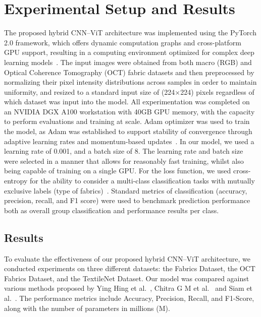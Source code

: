 \vspace{-1em}
\section{Experimental Setup and Results}

The proposed hybrid CNN–ViT architecture was implemented using the PyTorch 2.0 framework, which offers dynamic computation graphs and cross-platform GPU support, resulting in a computing environment optimized for complex deep learning models~\cite{paszke2019pytorch}. The input images were obtained from both macro (RGB) and Optical Coherence Tomography (OCT) fabric datasets and then preprocessed by normalizing their pixel intensity distributions across samples in order to maintain uniformity, and resized to a standard input size of (224×224) pixels regardless of which dataset was input into the model. All experimentation was completed on an NVIDIA DGX A100 workstation with 40GB GPU memory, with the capacity to perform evaluations and training at scale. Adam optimizer was used to train the model, as Adam was established to support stability of convergence through adaptive learning rates and momentum-based updates~\cite{kingma2014adam}. In our model, we used a learning rate of 0.001, and a batch size of 8. The learning rate and batch size were selected in a manner that allows for reasonably fast training, whilst also being capable of training on a single GPU. For the loss function, we used cross-entropy for the ability to consider a multi-class classification tasks with mutually exclusive labels (type of fabrics)~\cite{goodfellow2016deep}. Standard metrics of classification (accuracy, precision, recall, and F1 score) were used to benchmark prediction performance both as overall group classification and performance results per class.
\vspace{-2.25em}
\subsection{Results}

To evaluate the effectiveness of our proposed hybrid CNN–ViT architecture, we conducted experiments on three different datasets: the Fabrics Dataset, the OCT Fabrics Dataset, and the TextileNet Dataset. Our model was compared against various methods proposed by Ying Hing et al.~\cite{hong2024research}, Chitra G M et al.~\cite{chitra2023fabric} and Siam et al.~\cite{siam2023textilenet}. The performance metrics include Accuracy, Precision, Recall, and F1-Score, along with the number of parameters in millions (M).

